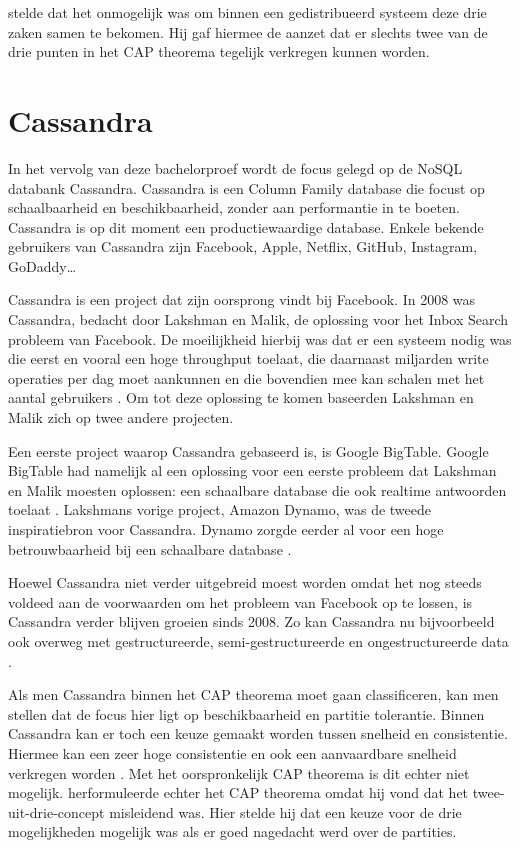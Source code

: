 \cite{brewer2000towards} stelde dat het onmogelijk was om binnen een gedistribueerd systeem deze drie zaken samen te bekomen.
Hij gaf hiermee de aanzet dat er slechts twee van de drie punten in het CAP theorema tegelijk verkregen kunnen worden.

\section{Cassandra}

In het vervolg van deze bachelorproef wordt de focus gelegd op de NoSQL databank Cassandra.
Cassandra is een Column Family database die focust op schaalbaarheid en beschikbaarheid, zonder aan performantie in te boeten.
Cassandra is op dit moment een productiewaardige database.
Enkele bekende gebruikers van Cassandra zijn Facebook, Apple, Netflix, GitHub, Instagram, GoDaddy\dots

Cassandra is een project dat zijn oorsprong vindt bij Facebook.
In 2008 was Cassandra, bedacht door Lakshman en Malik, de oplossing voor het Inbox Search probleem van Facebook.
De moeilijkheid hierbij was dat er een systeem nodig was die eerst en vooral een hoge throughput toelaat, die daarnaast miljarden write operaties per dag moet aankunnen en die bovendien mee kan schalen met het aantal gebruikers \citep{lakshman2010cassandra}.
Om tot deze oplossing te komen baseerden Lakshman en Malik zich op twee andere projecten.

Een eerste project waarop Cassandra gebaseerd is, is Google BigTable.
Google BigTable had namelijk al een oplossing voor een eerste probleem dat Lakshman en Malik moesten oplossen: een schaalbare database die ook realtime antwoorden toelaat \citep{chang2008bigtable}.
Lakshmans vorige project, Amazon Dynamo, was de tweede inspiratiebron voor Cassandra.
Dynamo zorgde eerder al voor een hoge betrouwbaarheid bij een schaalbare database \citep{decandia2007dynamo}.

Hoewel Cassandra niet verder uitgebreid moest worden omdat het nog steeds voldeed aan de voorwaarden om het probleem van Facebook op te lossen, is Cassandra verder blijven groeien sinds 2008.
Zo kan Cassandra nu bijvoorbeeld ook overweg met gestructureerde, semi-gestructureerde en ongestructureerde data \citep{kan2014cassandra}.

Als men Cassandra binnen het CAP theorema moet gaan classificeren, kan men stellen dat de focus hier ligt op beschikbaarheid en partitie tolerantie.
Binnen Cassandra kan er toch een keuze gemaakt worden tussen snelheid en consistentie.
Hiermee kan een zeer hoge consistentie en ook een aanvaardbare snelheid verkregen worden \citep{ellis2009cassandra}.
Met het oorspronkelijk CAP theorema is dit echter niet mogelijk.
\cite{brewer2012cap} herformuleerde echter het CAP theorema omdat hij vond dat het twee-uit-drie-concept misleidend was.
Hier stelde hij dat een keuze voor de drie mogelijkheden mogelijk was als er goed nagedacht werd over de partities.

